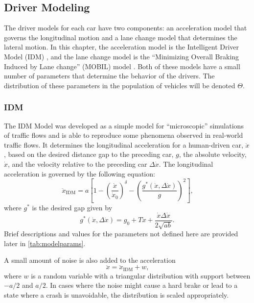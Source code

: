 \subsection{Driver Modeling} \label{sec:driver}

The driver models for each car have two components: an acceleration model that governs the longitudinal motion and a lane change model that determines the lateral motion.
In this chapter, the acceleration model is the Intelligent Driver Model (IDM) \cite{treiber2000idm}, and the lane change model is the ``Minimizing Overall Braking Induced by Lane change'' (MOBIL) model \cite{kesting2007mobil}.
Both of these models have a small number of parameters that determine the  behavior of the drivers.
The distribution of these parameters in the population of vehicles will be denoted $\Theta$.

\subsubsection{IDM}

The IDM Model was developed as a simple model for ``microscopic'' simulations of traffic flows and is able to reproduce some phenomena observed in real-world traffic flows.
It determines the longitudinal acceleration for a human-driven car, $\ddot{x}$, based on the desired distance gap to the preceding car, $g$, the absolute velocity, $\dot{x}$, and the velocity relative to the preceding car $\Delta \dot{x}$.
The longitudinal acceleration is governed by the following equation:
\begin{equation}
    \ddot{x}_\text{IDM} = a \left[ 1 - \left( \frac{\dot{x}}{\dot{x}_0} \right)^{\delta} - \left(\frac{g^*(\dot{x}, \Delta \dot{x})}{g}\right)^2 \right] \text{,}
\end{equation}
where $g^*$ is the desired gap given by
\begin{equation} \label{eqn:gstar}
    g^*(\dot{x}, \Delta \dot{x}) = g_0 + T \dot{x} + \frac{\dot{x}\Delta \dot{x}}{2 \sqrt{a b}} \text{.}
\end{equation}
Brief descriptions and values for the parameters not defined here are provided later in \cref{tab:modelparams}.

A small amount of noise is also added to the acceleration
\begin{equation}
    \ddot{x} = \ddot{x}_\text{IDM} + w \text{,}
\end{equation}
where $w$ is a random variable with a triangular distribution with support between $-a/2$ and $a/2$. In cases where the noise might cause a hard brake or lead to a state where a crash is unavoidable, the distribution is scaled appropriately.

